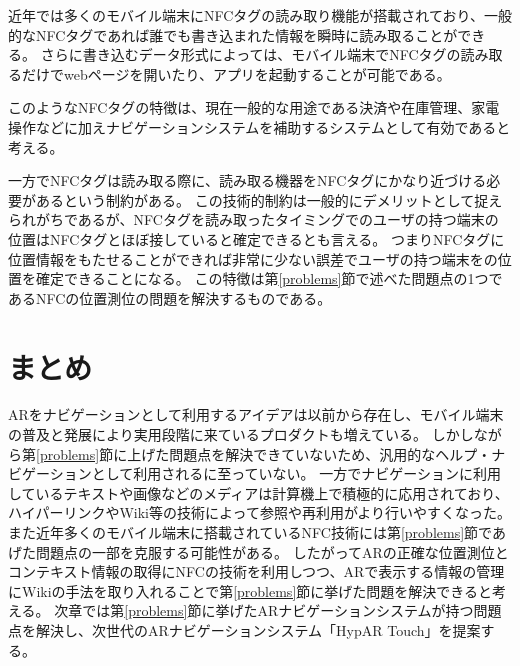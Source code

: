 近年では多くのモバイル端末にNFCタグの読み取り機能が搭載されており、一般的なNFCタグであれば誰でも書き込まれた情報を瞬時に読み取ることができる。
さらに書き込むデータ形式によっては、モバイル端末でNFCタグの読み取るだけでwebページを開いたり、アプリを起動することが可能である。

このようなNFCタグの特徴は、現在一般的な用途である決済や在庫管理、家電操作などに加えナビゲーションシステムを補助するシステムとして有効であると考える。

一方でNFCタグは読み取る際に、読み取る機器をNFCタグにかなり近づける必要があるという制約がある。
この技術的制約は一般的にデメリットとして捉えられがちであるが、NFCタグを読み取ったタイミングでのユーザの持つ端末の位置はNFCタグとほぼ接していると確定できるとも言える。
つまりNFCタグに位置情報をもたせることができれば非常に少ない誤差でユーザの持つ端末をの位置を確定できることになる。
この特徴は第\ref{problems}節で述べた問題点の1つであるNFCの位置測位の問題を解決するものである。



\section{まとめ}
ARをナビゲーションとして利用するアイデアは以前から存在し、モバイル端末の普及と発展により実用段階に来ているプロダクトも増えている。
しかしながら第\ref{problems}節に上げた問題点を解決できていないため、汎用的なヘルプ・ナビゲーションとして利用されるに至っていない。
一方でナビゲーションに利用しているテキストや画像などのメディアは計算機上で積極的に応用されており、ハイパーリンクやWiki等の技術によって参照や再利用がより行いやすくなった。
また近年多くのモバイル端末に搭載されているNFC技術には第\ref{problems}節であげた問題点の一部を克服する可能性がある。
したがってARの正確な位置測位とコンテキスト情報の取得にNFCの技術を利用しつつ、ARで表示する情報の管理にWikiの手法を取り入れることで第\ref{problems}節に挙げた問題を解決できると考える。
次章では第\ref{problems}節に挙げたARナビゲーションシステムが持つ問題点を解決し、次世代のARナビゲーションシステム「HypAR Touch」を提案する。